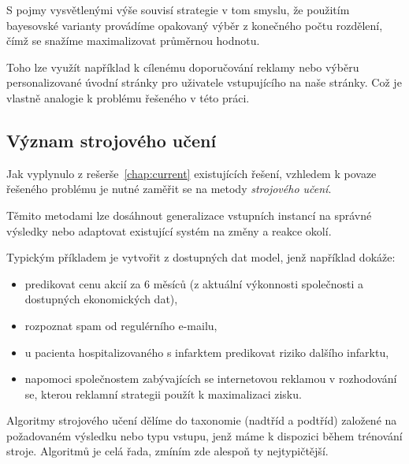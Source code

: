 \documentclass[thesis=M,czech]{FITthesis}[2014/05/07]
\begin{document}
S pojmy vysvětlenými výše souvisí strategie v tom smyslu, že použitím bayesovské varianty provádíme opakovaný výběr z konečného počtu rozdělení, čímž se snažíme maximalizovat průměrnou hodnotu.

Toho lze využít například k cílenému doporučování reklamy nebo výběru personalizované úvodní stránky pro uživatele vstupujícího na naše stránky. Což je vlastně analogie k problému řešeného v této práci.

\subsection{Význam strojového učení}
\label{sec:machine}

Jak vyplynulo z rešerše~\ref{chap:current} existujících řešení, vzhledem k povaze řešeného problému je nutné zaměřit se na metody \emph{strojového učení}. 

Těmito metodami lze dosáhnout generalizace vstupních instancí na správné výsledky nebo adaptovat existující systém na změny a reakce okolí. 

Typickým příkladem je vytvořit z dostupných dat model, jenž například dokáže:

\begin{itemize}
  \item predikovat cenu akcií za 6 měsíců (z aktuální výkonnosti společnosti a dostupných ekonomických dat),
  \item rozpoznat spam od regulérního e-mailu,
  \item u pacienta hospitalizovaného s infarktem predikovat riziko dalšího infarktu,
  \item napomoci společnostem zabývajících se internetovou reklamou v rozhodování se, kterou reklamní strategii použít k maximalizaci zisku.
\end{itemize}

Algoritmy strojového učení dělíme do taxonomie (nadtříd a podtříd) založené na požadovaném výsledku nebo typu vstupu, jenž máme k dispozici během trénování stroje. Algoritmů je celá řada, zmíním zde alespoň ty nejtypičtější. 
\end{document}

